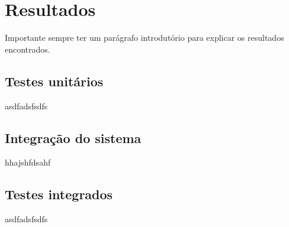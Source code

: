 \chapter{Resultados}
\label{chap:result}
Importante sempre ter um parágrafo introdutório para explicar os resultados encontrados.

\section{Testes unitários}
\label{sec:testu}
asdfadsfsdfs

\section{Integração do sistema}
\label{sec:intsis}
hhajshfdsahf

\section{Testes integrados}
\label{sec:testi}
asdfadsfsdfs








